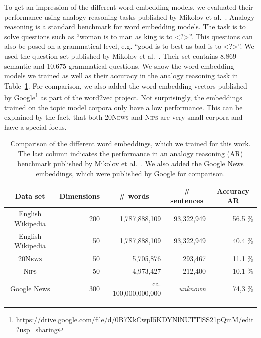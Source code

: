 \documentclass[
        a4paper,
        titlepage,
        twoside,
        parskip,
        numbers=noenddot
        ]{scrbook}
\newcommand{\ra}[1]{\renewcommand{\arraystretch}{#1}}
\theoremstyle{break}
\begin{document}
To get an impression of the different word embedding models, we evaluated their performance using analogy reasoning tasks published by Mikolov et al.~\cite{Mikolov2013}.
Analogy reasoning is a standard benchmark for word embedding models.
The task is to solve questions such as ``woman is to man as king is to \textless?\textgreater''.
This questions can also be posed on a grammatical level, e.g. ``good is to best as bad is to \textless?\textgreater''.
We used the question-set published by Mikolov et al.~\cite{Mikolov2013b}.
Their set contains 8,869 semantic and 10,675 grammatical questions.
We show the word embedding models we trained as well as their accuracy in the analogy reasoning task in Table~\ref{table:word_embeddings_performance}.
For comparison, we also added the word embedding vectors published by Google\footnote{\url{https://drive.google.com/file/d/0B7XkCwpI5KDYNlNUTTlSS21pQmM/edit?usp=sharing}} as part of the word2vec project.
Not surprisingly, the embeddings trained on the topic model corpora only have a low performance.
This can be explained by the fact, that both \textsc{20News} and \textsc{Nips} are very small corpora and have a special focus.

\begin{table}[]
  \ra{1.3}
  \centering
  \caption{Comparison of the different word embeddings, which we trained for this work.
  The last column indicates the performance in an analogy reasoning (AR) benchmark published by Mikolov et al.~\cite{Mikolov2013b}.
  We also added the Google News embeddings, which were published by Google for comparison.}
  \label{table:word_embeddings_performance}
  \begin{tabular}{crrrr}
    \toprule
    \multicolumn{1}{c}{Data set} & \multicolumn{1}{c}{Dimensions} & \multicolumn{1}{c}{\# words} & \multicolumn{1}{c}{\# sentences} & \multicolumn{1}{c}{Accuracy AR} \\
    \midrule
    English Wikipedia & 200                 & 1,787,888,109     & 93,322,949            & 56.5 \%              \\
    English Wikipedia & 50                  & 1,787,888,109     & 93,322,949            & 40.4 \%              \\
    \textsc{20News}            & 50                  & 5,705,876         & 293,467               & 11.1 \%              \\
    \textsc{Nips}              & 50                  & 4,973,427         & 212,400               & 10.1 \%              \\
    Google News       & 300                 & ca. 100,000,000,000       & \textit{unknown}      & 74,3 \%              \\
    \bottomrule
  \end{tabular}
\end{table}
\end{document}
